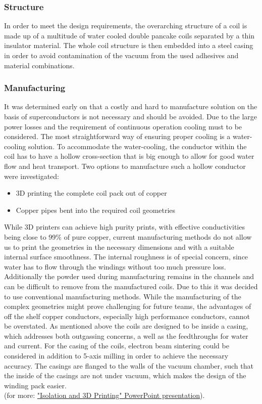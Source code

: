 \subsubsection{Structure}
In order to meet the design requirements, the overarching structure of a coil is made up of a multitude of water cooled double pancake coils separated by a thin insulator material.
The whole coil structure is then embedded into a steel casing in order to avoid contamination of the vacuum from the used adhesives and material combinations.

\subsubsection{Manufacturing}
It was determined early on that a costly and hard to manufacture solution on the basis of superconductors is not necessary and should be avoided.
Due to the large power losses and the requirement of continuous operation cooling must to be considered.
The most straightforward way of ensuring proper cooling is a water-cooling solution.
To accommodate the water-cooling, the conductor within the coil has to have a hollow cross-section that is big enough to allow for good water flow and heat transport.
Two options to manufacture such a hollow conductor were investigated:
\begin{itemize}
    \item 3D printing the complete coil pack out of copper
    \item Copper pipes bent into the required coil geometries
\end{itemize}
While 3D printers can achieve high purity prints, with effective conductivities being close to 99\% of pure copper, current manufacturing methods do not allow us to print the geometries in the necessary dimensions and with a suitable internal surface smoothness.
The internal roughness is of special concern, since water has to flow through the windings without too much pressure loss.
Additionally the powder used during manufacturing remains in the channels and can be difficult to remove from the manufactured coils.
Due to this it was decided to use conventional manufacturing methods.
While the manufacturing of the complex geometries might prove challenging for future teams, the advantages of off the shelf copper conductors, especially high performance conductors, cannot be overstated.
As mentioned above the coils are designed to be inside a casing, which addresses both outgassing concerns, a well as the feedthroughs for water and current.
For the casing of the coils, electron beam sintering could be considered in addition to 5-axis milling in order to achieve the necessary accuracy.
The casings are flanged to the walls of the vacuum chamber, such that the inside of the casings are not under vacuum, which makes the design of the winding pack easier.\\
(for more: \href{https://cloud.tugraz.at/index.php/apps/onlyoffice/s/XBeMB6XiRDt3L2p?fileId=1032740140}{"Isolation and 3D Printing" PowerPoint presentation}).


